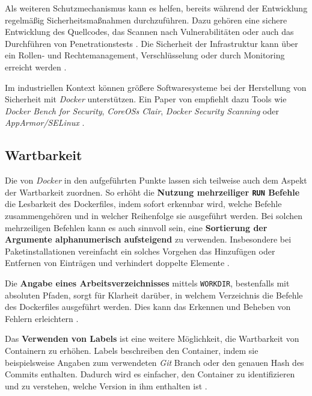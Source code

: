 Als weiteren Schutzmechanismus kann es helfen, bereits während der Entwicklung regelmäßig Sicherheitsmaßnahmen durchzuführen. Dazu gehören eine sichere Entwicklung des Quellcodes, das Scannen nach Vulnerabilitäten oder auch das Durchführen von Penetrationstests \cite{023:Setting-up-CI-CD-Pipeline-in-the-Cloud-for-Web-Application}. Die Sicherheit der Infrastruktur kann über ein Rollen- und Rechtemanagement, Verschlüsselung oder durch Monitoring erreicht werden \cite{023:Setting-up-CI-CD-Pipeline-in-the-Cloud-for-Web-Application,024:Investiugating-Impact-of-Containerization-on-Deployment-Process-in-DevOps}.

Im industriellen Kontext können größere Softwaresysteme bei der Herstellung von Sicherheit mit \textit{Docker} unterstützen. Ein Paper von \citeauthor{022:Automated-Cloud-Infrastructure-Continuous-Integration-and-Continuous-Delivery-using-Docker} empfiehlt dazu Tools wie \textit{Docker Bench for Security}, \textit{CoreOSs Clair}, \textit{Docker Security Scanning} oder \textit{AppArmor/SELinux} \cite{022:Automated-Cloud-Infrastructure-Continuous-Integration-and-Continuous-Delivery-using-Docker}.

\subsection{Wartbarkeit}
\label{subsec:05-03-03_maintainability}

Die von \textit{Docker} in den  aufgeführten Punkte lassen sich teilweise auch dem Aspekt der Wartbarkeit zuordnen. So erhöht die \textbf{Nutzung mehrzeiliger \texttt{RUN} Befehle} die Lesbarkeit des Dockerfiles, indem sofort erkennbar wird, welche Befehle zusammengehören und in welcher Reihenfolge sie ausgeführt werden. Bei solchen mehrzeiligen Befehlen kann es auch sinnvoll sein, eine \textbf{Sortierung der Argumente alphanumerisch aufsteigend} zu verwenden. Insbesondere bei Paketinstallationen vereinfacht ein solches Vorgehen das Hinzufügen oder Entfernen von Einträgen und verhindert doppelte Elemente \cite{300:Building-Best-Practices}.

Die \textbf{Angabe eines Arbeitsverzeichnisses} mittels \texttt{WORKDIR}, bestenfalls mit absoluten Pfaden, sorgt für Klarheit darüber, in welchem Verzeichnis die Befehle des Dockerfiles ausgeführt werden. Dies kann das Erkennen und Beheben von Fehlern erleichtern \cite{300:Building-Best-Practices}.

Das \textbf{Verwenden von Labels} ist eine weitere Möglichkeit, die Wartbarkeit von Containern zu erhöhen. Labels beschreiben den Container, indem sie beispielsweise Angaben zum verwendeten \textit{Git} Branch oder den genauen Hash des Commits enthalten. Dadurch wird es einfacher, den Container zu identifizieren und zu verstehen, welche Version in ihm enthalten ist \cite{013:Role-of-Containers-in-Reproducibility,300:Building-Best-Practices}.

